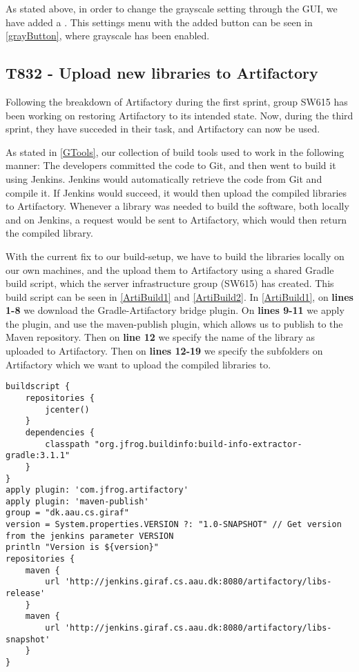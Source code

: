 As stated above, in order to change the grayscale setting through the GUI, we
have added a . This settings menu with the added button can
be seen in \autoref{grayButton}, where grayscale has been enabled. 



\subsection{T832 - Upload new libraries to Artifactory}
Following the breakdown of Artifactory during the first sprint, group SW615 has
been working on restoring Artifactory to its intended state. Now, during the
third sprint, they have succeded in their task, and Artifactory can now be
used.\nl

As stated in \autoref{GTools}, our collection of build tools used to work in
the following manner: 
The developers committed the code to Git, and then went to
build it using Jenkins. Jenkins would automatically retrieve the code
from Git and compile it. If Jenkins would succeed, it would then upload the
compiled libraries to Artifactory. Whenever a library was needed to build the
software, both locally and on Jenkins, a request would be sent to Artifactory,
which would then return the compiled library.\nl

With the current fix to our build-setup, we have to build the libraries locally
on our own machines, and the upload them to Artifactory using a shared Gradle
build script, which the server infrastructure group (SW615) has created. This
build script can be seen in \autoref{ArtiBuild1} and \autoref{ArtiBuild2}. In
\autoref{ArtiBuild1}, on \textbf{lines 1-8} we download the Gradle-Artifactory
bridge plugin\citep{Gradle-Artifactory}. On \textbf{lines 9-11} we apply the
plugin, and use the maven-publish plugin, which allows us to publish to the
Maven repository. Then on \textbf{line 12} we specify the name of the library as
uploaded to Artifactory. Then on \textbf{lines 12-19} we specify the
subfolders on Artifactory which we want to upload the compiled libraries to.\nl

\begin{minipage}[H]{\linewidth}
\begin{lstlisting}[caption = Specifying file names and subfolder paths on Artifactory, label = ArtiBuild1] 
buildscript {
    repositories {
        jcenter()
    }
    dependencies {
        classpath "org.jfrog.buildinfo:build-info-extractor-gradle:3.1.1"
    }
}
apply plugin: 'com.jfrog.artifactory'
apply plugin: 'maven-publish'
group = "dk.aau.cs.giraf"
version = System.properties.VERSION ?: "1.0-SNAPSHOT" // Get version from the jenkins parameter VERSION
println "Version is ${version}"
repositories {
    maven {
        url 'http://jenkins.giraf.cs.aau.dk:8080/artifactory/libs-release'
    }
    maven {
        url 'http://jenkins.giraf.cs.aau.dk:8080/artifactory/libs-snapshot'
    }
}
\end{lstlisting}
\end{minipage}

